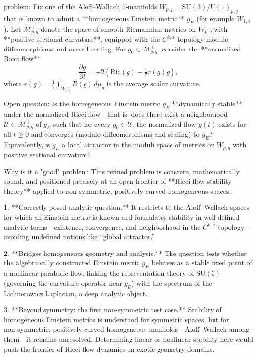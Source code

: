 problem:  
Fix one of the Aloff–Wallach 7‑manifolds \(W_{p,q} = \mathrm{SU}(3)/\mathrm{U}(1)_{p,q}\) that is known to admit a **homogeneous Einstein metric** \(g_{E}\) (for example \(W_{1,1}\)).  
Let \(\mathcal{M}^+_{p,q}\) denote the space of smooth Riemannian metrics on \(W_{p,q}\) with **positive sectional curvature**, equipped with the \(C^{k,\alpha}\) topology modulo diffeomorphisms and overall scaling.  
For \(g_0 \in \mathcal{M}^+_{p,q}\), consider the **normalized Ricci flow**
\[
\frac{\partial g}{\partial t} = -2(\mathrm{Ric}(g) - \tfrac{1}{7}r(g) g),
\]
where \(r(g) = \tfrac{1}{7}\int_{W_{p,q}} R(g)\,d\mu_g\) is the average scalar curvature.  

Open question:  
Is the homogeneous Einstein metric \(g_E\) **dynamically stable** under the normalized Ricci flow—that is, does there exist a neighborhood \(\mathcal{U}\subset \mathcal{M}^+_{p,q}\) of \(g_E\) such that for every \(g_0\in\mathcal{U}\), the normalized flow \(g(t)\) exists for all \(t\ge0\) and converges (modulo diffeomorphisms and scaling) to \(g_E\)?  
Equivalently, is \(g_E\) a local attractor in the moduli space of metrics on \(W_{p,q}\) with positive sectional curvature?

Why is it a "good" problem:  
This refined problem is concrete, mathematically sound, and positioned precisely at an open frontier of **Ricci flow stability theory** applied to non‑symmetric, positively curved homogeneous spaces.

1. **Correctly posed analytic question.**  
   It restricts to the Aloff–Wallach spaces for which an Einstein metric is known and formulates stability in well-defined analytic terms—existence, convergence, and neighborhood in the \(C^{k,\alpha}\) topology—avoiding undefined notions like “global attractor.”

2. **Bridges homogeneous geometry and analysis.**  
   The question tests whether the algebraically constructed Einstein metric \(g_E\) behaves as a stable fixed point of a nonlinear parabolic flow, linking the representation theory of \(\mathrm{SU}(3)\) (governing the curvature operator near \(g_E\)) with the spectrum of the Lichnerowicz Laplacian, a deep analytic object.

3. **Beyond symmetry: the first non‑symmetric test case.**  
   Stability of homogeneous Einstein metrics is understood for symmetric spaces, but for non‑symmetric, positively curved homogeneous manifolds—Aloff–Wallach among them—it remains unresolved.  
   Determining linear or nonlinear stability here would push the frontier of Ricci flow dynamics on exotic geometry domains.

